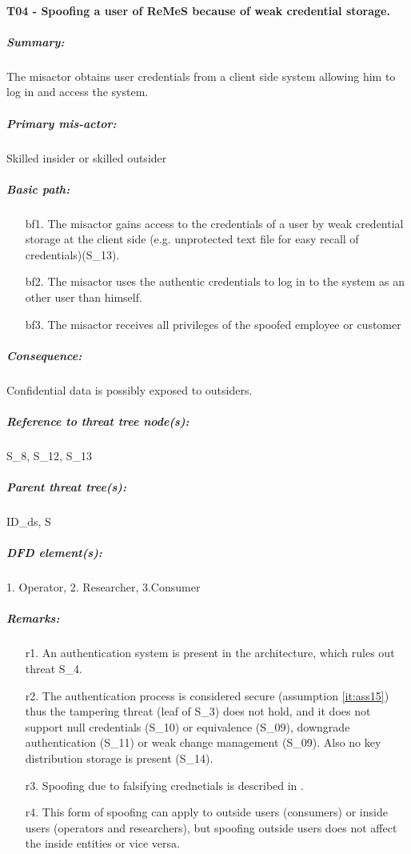 

\paragraph{T04 - Spoofing a user of ReMeS because of weak credential storage. } 
\label{par:t04}
    \subparagraph{Summary:} The misactor obtains user credentials from a client side system allowing him to log in and access the system.
    \subparagraph{Primary mis-actor:} Skilled insider or skilled outsider
    \subparagraph{Basic path:} 
    \begin{enumerate}
        \item[bf1.]{ The misactor gains access to the credentials of a user by weak credential storage at the client side 
(e.g. unprotected text file for easy recall of credentials)(S\_13). }
        \item[bf2.]{ The misactor uses the authentic credentials to log in to the system as an other user than himself.}
        \item[bf3.]{ The misactor receives all privileges of the spoofed employee or customer}
    \end{enumerate}
    \subparagraph{Consequence:} Confidential data is possibly exposed to outsiders.

    \subparagraph{Reference to threat tree node(s):} S\_8, S\_12, S\_13
    \subparagraph{Parent threat tree(s):} ID\_ds, S
    \subparagraph{DFD element(s):}1. Operator, 2. Researcher, 3.Consumer
    \subparagraph{Remarks:}
    \begin{enumerate}
        \item[r1.] An authentication system is present in the architecture, which rules out threat S\_4.
        \item[r2.] The authentication process is considered secure (assumption \ref{it:ass15}) thus the tampering threat (leaf of S\_3) does not hold, 
and it does not support null credentials (S\_10) or equivalence (S\_09), downgrade authentication (S\_11) 
or weak change management (S\_09). Also no key distribution storage is present (S\_14).
	\item[r3.] Spoofing due to falsifying crednetials is described in .
	\item[r4.] This form of spoofing can apply to outside users (consumers) or inside users (operators and researchers), but spoofing outside users does not affect the inside entities or vice versa.
    \end{enumerate}



